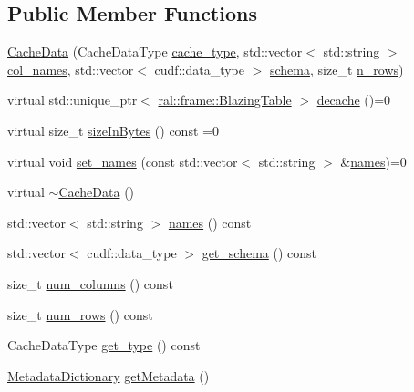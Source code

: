 \subsection*{Public Member Functions}
\begin{DoxyCompactItemize}
\item 
\hyperlink{classral_1_1cache_1_1CacheData_a257a4e0a13e894093e8ae37da1612c62}{Cache\+Data} (Cache\+Data\+Type \hyperlink{classral_1_1cache_1_1CacheData_acf9d130e22baac61d4689c52e36b9c17}{cache\+\_\+type}, std\+::vector$<$ std\+::string $>$ \hyperlink{classral_1_1cache_1_1CacheData_a7a43a46a362c8fe93a7af81debbeca1b}{col\+\_\+names}, std\+::vector$<$ cudf\+::data\+\_\+type $>$ \hyperlink{classral_1_1cache_1_1CacheData_aec9a1b3c0fb78cfdb3bd5494bcee2d8f}{schema}, size\+\_\+t \hyperlink{classral_1_1cache_1_1CacheData_a4cdddfb8e552e0e3e91877ae80e5fc9e}{n\+\_\+rows})
\item 
virtual std\+::unique\+\_\+ptr$<$ \hyperlink{classral_1_1frame_1_1BlazingTable}{ral\+::frame\+::\+Blazing\+Table} $>$ \hyperlink{classral_1_1cache_1_1CacheData_a2db8fdd2151babd7a07f4c6e246b710c}{decache} ()=0
\item 
virtual size\+\_\+t \hyperlink{classral_1_1cache_1_1CacheData_aaad8a726296574845f01f9380dcee40d}{size\+In\+Bytes} () const =0
\item 
virtual void \hyperlink{classral_1_1cache_1_1CacheData_a3bb1623a4266ba7c961d325023ff13c6}{set\+\_\+names} (const std\+::vector$<$ std\+::string $>$ \&\hyperlink{classral_1_1cache_1_1CacheData_aa2c8d58823d781cc1f8e6e589d897642}{names})=0
\item 
virtual \hyperlink{classral_1_1cache_1_1CacheData_ac66a4910198d677594609b455c4ecde8}{$\sim$\+Cache\+Data} ()
\item 
std\+::vector$<$ std\+::string $>$ \hyperlink{classral_1_1cache_1_1CacheData_aa2c8d58823d781cc1f8e6e589d897642}{names} () const
\item 
std\+::vector$<$ cudf\+::data\+\_\+type $>$ \hyperlink{classral_1_1cache_1_1CacheData_a747bc7b9113756471ce8a7bce2c46689}{get\+\_\+schema} () const
\item 
size\+\_\+t \hyperlink{classral_1_1cache_1_1CacheData_acddfe8617004fc875fff972ae5b1f616}{num\+\_\+columns} () const
\item 
size\+\_\+t \hyperlink{classral_1_1cache_1_1CacheData_a14a5b9fadf872c12d633e38bb6f9f07d}{num\+\_\+rows} () const
\item 
Cache\+Data\+Type \hyperlink{classral_1_1cache_1_1CacheData_a6669c7c34305f2099cede2be98433604}{get\+\_\+type} () const
\item 
\hyperlink{classral_1_1cache_1_1MetadataDictionary}{Metadata\+Dictionary} \hyperlink{classral_1_1cache_1_1CacheData_a7e3fea5c3558948f4c461998f7ef434b}{get\+Metadata} ()
\end{DoxyCompactItemize}
